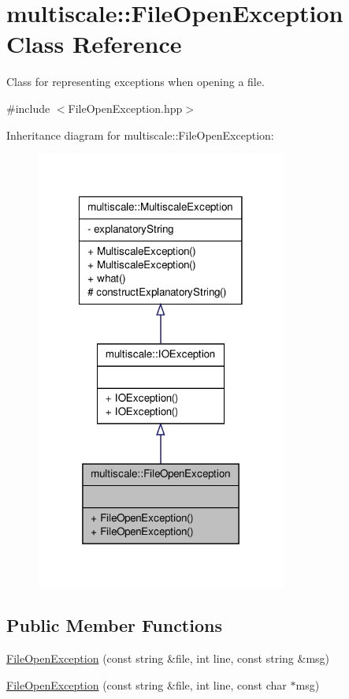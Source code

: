 \hypertarget{classmultiscale_1_1FileOpenException}{\section{multiscale\-:\-:\-File\-Open\-Exception \-Class \-Reference}
\label{classmultiscale_1_1FileOpenException}
}


\-Class for representing exceptions when opening a file.  




{\ttfamily \#include $<$\-File\-Open\-Exception.\-hpp$>$}



\-Inheritance diagram for multiscale\-:\-:\-File\-Open\-Exception\-:\nopagebreak
\begin{figure}[H]
\begin{center}
\leavevmode
\includegraphics[width=234pt]{classmultiscale_1_1FileOpenException__inherit__graph}
\end{center}
\end{figure}
\subsection*{\-Public \-Member \-Functions}
\begin{DoxyCompactItemize}
\item 
\hyperlink{classmultiscale_1_1FileOpenException_ae574327fb5ac6e396d8c37263f8a2815}{\-File\-Open\-Exception} (const string \&file, int line, const string \&msg)
\item 
\hyperlink{classmultiscale_1_1FileOpenException_adddaf8af54fd3bdeb5f63d5a6736fd45}{\-File\-Open\-Exception} (const string \&file, int line, const char $\ast$msg)
\end{DoxyCompactItemize}


